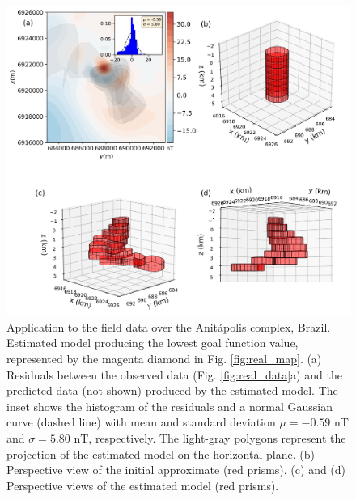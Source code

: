 \begin{figure}
	\centering
	\includegraphics[width=\linewidth]{figures/real_results_magenta_diamond.png}
	\caption{Application to the field data over the Anit{\'a}polis complex, Brazil.
	Estimated model producing the lowest goal function value, 
	represented by the magenta diamond in Fig. \ref{fig:real_map}.
	(a) Residuals between the observed data (Fig. \ref{fig:real_data}a) and the 
	predicted data (not shown) produced by the estimated model. 
	The inset shows the histogram of the residuals and a normal 
	Gaussian curve (dashed line) with mean and standard deviation 
	$\mu = -0.59$ nT and $\sigma = 5.80$ nT, respectively.
	The light-gray polygons represent the projection of the estimated 
	model on the horizontal plane. 
	(b) Perspective view of the initial approximate (red prisms). 
	(c) and (d) Perspective views of the estimated model (red prisms).}
	\label{fig:real_result2}
\end{figure}

